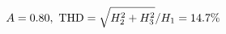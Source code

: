 \documentclass[preview]{standalone}
\begin{document}
\begin{align*}
\special{dvisvgm:raw <g id='unique000'>}A=0.80,\ \text{THD}=\sqrt{H_2^2+H_3^2}/H_1=14.7\%\special{dvisvgm:raw </g>}
\end{align*}
\end{document}
